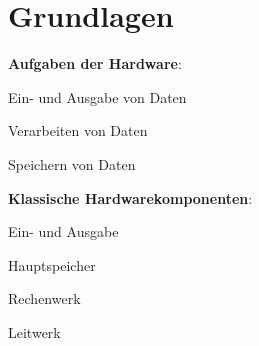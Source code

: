\section{Grundlagen} %
\label{sec:grundlagen}
  \textbf{Aufgaben der Hardware}:
  \begin{items}
    \item Ein- und Ausgabe von Daten
    \item Verarbeiten von Daten
    \item Speichern von Daten
  \end{items}

  \textbf{Klassische Hardwarekomponenten}:
  \begin{items}
    \item Ein- und Ausgabe
    \item Hauptspeicher
    \item Rechenwerk
    \item Leitwerk
  \end{items}